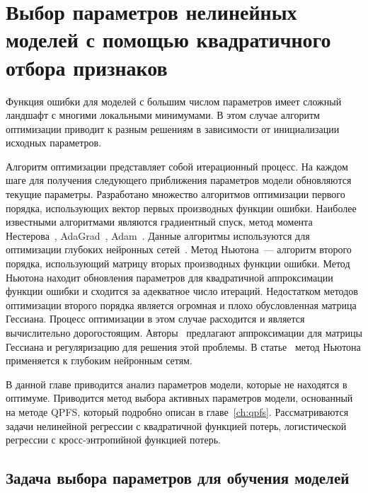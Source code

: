 \chapter{Выбор параметров нелинейных моделей с помощью квадратичного отбора признаков}
\label{ch:newton_qpfs}

Функция ошибки для моделей с большим числом параметров имеет сложный ландшафт с многими локальными минимумами.
В этом случае алгоритм оптимизации приводит к разным решениям в зависимости от инициализации исходных параметров.

Алгоритм оптимизации представляет собой итерационный процесс.
На каждом шаге для получения следующего приближения параметров модели обновляются текущие параметры.
Разработано множество алгоритмов оптимизации первого порядка, использующих вектор первых производных функции ошибки.
Наиболее известными алгоритмами являются градиентный спуск, 
метод момента Нестерова~\cite{nesterov1983momentum}, AdaGrad~\cite{duchi2011adagrad}, Adam~\cite{kingma2014adam}.
Данные алгоритмы используются для оптимизации глубоких нейронных сетей~\cite{goodfellow2016deeplearningbook}.
Метод Ньютона~--- алгоритм второго порядка, использующий матрицу вторых производных функции ошибки.
Метод Ньютона находит обновления параметров для квадратичной аппроксимации функции ошибки и сходится за адекватное число итераций.
Недостатком методов оптимизации второго порядка является огромная и плохо обусловленная матрица Гессиана.
Процесс оптимизации в этом случае расходится и является вычислительно дорогостоящим.
Авторы~\cite{avriel2003nonlinear,blaschke1997convergence} предлагают аппроксимации для матрицы Гессиана и регуляризацию для решения этой проблемы.
В статье~\cite{botev2017newtondeeplearning} метод Ньютона применяется к глубоким нейронным сетям.

В данной главе приводится анализ параметров модели, которые не находятся в оптимуме.
Приводится метод выбора активных параметров модели, основанный на методе QPFS, который подробно описан в главе~\ref{ch:qpfs}.
Рассматриваются задачи нелинейной регрессии с квадратичной функцией потерь, логистической регрессии с кросс-энтропийной функцией потерь.  

\section{Задача выбора параметров для обучения моделей}
\label{sec:ch4:newton_qpfs_param_selection}

